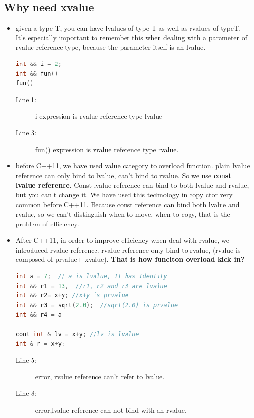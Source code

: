 \documentclass[a4paper,11pt,twoside]{book}
\begin{document}
\subsection{Why need xvalue}
\begin{itemize}
	\item given a type T, you can have lvalues of type T as well as rvalues of typeT. It's especially important to remember this when dealing with a parameter of rvalue reference type, because the parameter itself is an lvalue.
\begin{lstlisting}[frame=single, language=c++, mathescape=true]
int && i = 2;  
int && fun()
fun() 
\end{lstlisting}
\begin{description}
	\item[Line 1:] i expression is rvalue reference type lvalue
	\item[Line 3:] fun() expression is vralue reference type rvalue. 
\end{description}
	
	\item before C++11, we have used value category to overload function. plain lvalue reference can only bind to lvalue, can't bind to rvalue. So we use \textbf{const lvalue reference}.  Const lvalue reference can bind to both lvalue and rvalue, but you can't change it. We have used this technology in copy ctor very common before C++11. Because const reference can bind both lvalue and rvalue, so we can't distinguish when to move, when to copy, that is the problem of efficiency.
	
	\item After C++11, in order to improve efficiency when deal with rvalue, we introduced rvalue reference.  rvalue reference only bind to rvalue, (rvalue is composed of prvalue+ xvalue). \textbf{That is how funciton overload kick in?}

\begin{lstlisting}[frame=single, language=c++, mathescape=true]
int a = 7;  // a is lvalue, It has Identity
int && r1 = 13,  //r1, r2 and r3 are lvalue
int && r2= x+y; //x+y is prvalue
int && r3 = sqrt(2.0);  //sqrt(2.0) is prvalue
int && r4 = a 

cont int & lv = x+y; //lv is lvalue
int & r = x+y; 
\end{lstlisting}
\begin{description}
	\item[Line 5:] error, rvalue reference can't refer to lvalue.
	\item[Line 8:] error,lvalue reference can not bind with an rvalue.
\end{description}
	

\end{itemize}
\end{document}
